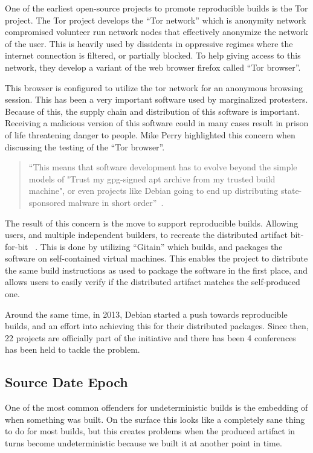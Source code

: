 \documentclass[../Main/thesis.tex]{subfiles}
\begin{document}
One of the earliest open-source projects to promote reproducible builds is the
Tor project. The Tor project develops the ``Tor network'' which is anonymity
network compromised volunteer run network nodes that effectively anonymize the
network of the user. This is heavily used by dissidents in oppressive regimes
where the internet connection is filtered, or partially blocked. To help giving
access to this network, they develop a variant of the web browser firefox called
``Tor browser''.


This browser is configured to utilize the tor network for an anonymous browsing
session. This has been a very important software used by marginalized
protesters. Because of this, the supply chain and distribution of this software
is important. Receiving a malicious version of this software could in many cases
result in prison of life threatening danger to people. Mike Perry highlighted
this concern when discussing the testing of the ``Tor browser''.

\begin{quotation}
``This means that software development has to evolve beyond the simple models of
"Trust my gpg-signed apt archive from my trusted build machine", or even
projects like Debian going to end up distributing state-sponsored malware in
short order''~\cite{mike-perry-2013}.
\end{quotation}


The result of this concern is the move to support reproducible builds. Allowing
users, and multiple independent builders, to recreate the distributed artifact
bit-for-bit ~\cite{unknown-2014}. This is done by utilizing ``Gitain'' which
builds, and packages the software on self-contained virtual machines. This
enables the project to distribute the same build instructions as used to package
the software in the first place, and allows users to easily verify if the
distributed artifact matches the self-produced one.


Around the same time, in 2013, Debian started a push towards reproducible
builds, and an effort into achieving this for their distributed packages. Since
then, 22 projects are officially part of the initiative and there has been 4
conferences has been held to tackle the problem.

\subsection*{Source Date Epoch}
One of the most common offenders for undeterministic builds is the embedding of
when something was built. On the surface this looks like a completely sane thing
to do for most builds, but this creates problems when the produced artifact in
turns become undeterministic because we built it at another point in time.
\end{document}
